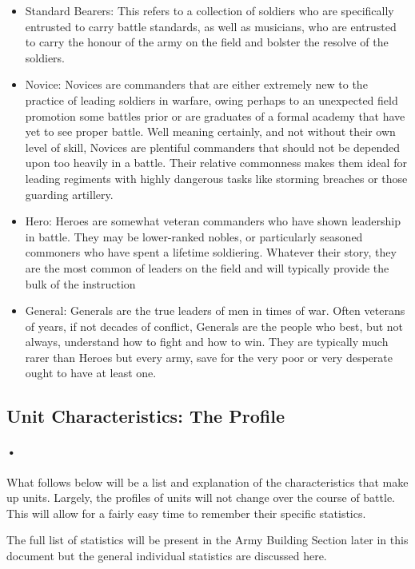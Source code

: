 \documentclass{article}
\begin{document}
\begin{itemize}
\item Standard Bearers: This refers to a collection of soldiers who are specifically entrusted to carry battle standards, as well as musicians, who are entrusted to carry the honour of the army on the field and bolster the resolve of the soldiers.
\item Novice: Novices are commanders that are either extremely new to the practice of leading soldiers in warfare, owing perhaps to an unexpected field promotion some battles prior or are graduates of a formal academy that have yet to see proper battle. Well meaning certainly, and not without their own level of skill, Novices are plentiful commanders that should not be depended upon too heavily in a battle. Their relative commonness makes them ideal for leading regiments with highly dangerous tasks like storming breaches or those guarding artillery.
\item Hero: Heroes are somewhat veteran commanders who have shown leadership in battle. They may be lower-ranked nobles, or particularly seasoned commoners who have spent a lifetime soldiering. Whatever their story, they are the most common of leaders on the field and will typically provide the bulk of the instruction
\item General: Generals are the true leaders of men in times of war. Often veterans of years, if not decades of conflict, Generals are the people who best, but not always, understand how to fight and how to win. They are typically much rarer than Heroes but every army, save for the very poor or very desperate ought to have at least one.
\end{itemize}

\subsection{Unit Characteristics: The Profile}
\paragraph{•}
What follows below will be a list and explanation of the characteristics that make up units. Largely, the profiles of units will not change over the course of battle. This will allow for a fairly easy time to remember their specific statistics.

The full list of statistics will be present in the Army Building Section later in this document but the general individual statistics are discussed here.
\end{document}
